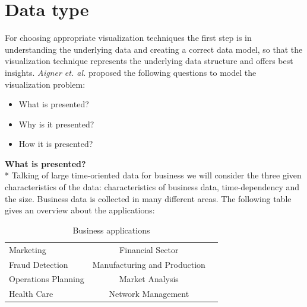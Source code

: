 \section{Data type}
For choosing appropriate visualization techniques the first step is in understanding the underlying data and creating a correct data model\cite{Aigner2011}, so that the visualization technique represents the underlying data structure and offers best insights\cite{Bacic}. \textit{Aigner et. al.} proposed  the following questions to model the visualization problem: 
\begin{itemize}
    \item What is presented?
    \item Why is it presented?
    \item How it is presented?
\end{itemize}
\textbf{What is presented?}\\*
Talking of large time-oriented data for business we will consider the three given characteristics of the data: characteristics of business data, time-dependency and the size. Business data is collected in many different areas. The following table gives an overview about the applications: 

\begin{table}[th]
	\centering
	\caption[Table 1]{Business applications\cite{Brachman1996,Tegarden1999}}
	\label{businessapplications}
	\begin{tabu}{lcc}
	\toprule
	Marketing & Financial Sector \\
	Fraud Detection & Manufacturing and Production \\
	Operations Planning & Market Analysis \\
	Health Care & Network Management\\
	\bottomrule
	\end{tabu}
\end{table}

